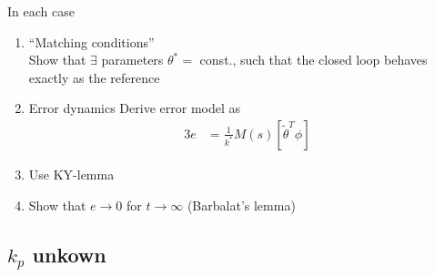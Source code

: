 In each case
\begin{enumerate}[label=\alph*)]
\item ``Matching conditions''\\
    Show that $\exists$ parameters $\theta^* = $ const.,
    such that the closed loop behaves exactly as the reference
\item Error dynamics
    Derive error model as 
    \begin{alignat*}{3}
    e &= \frac{1}{k^*} M(s) \left[ \tilde{\theta}^T \phi \right]
    \end{alignat*}
\item Use KY-lemma
\item Show that $e \rightarrow 0$ for $t \rightarrow \infty$ 
    (Barbalat's lemma)
\end{enumerate}

\subsection{$k_p$ unkown}


